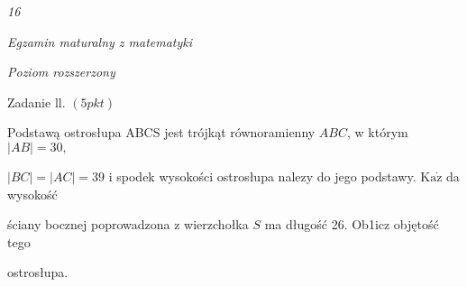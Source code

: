 \documentclass[a4paper,12pt]{article}
\begin{document}
{\it 16}

{\it Egzamin maturalny z matematyki}

{\it Poziom rozszerzony}

Zadanie ll. $(5pkt)$

Podstawą ostrosłupa ABCS jest trójkąt równoramienny $ABC$, w którym $|AB|=30,$

$|BC|=|AC|=39$ i spodek wysokości ostrosłupa nalez$\mathrm{y}$ do jego podstawy. $\mathrm{K}\mathrm{a}\dot{\mathrm{z}}$ da wysokość

ściany bocznej poprowadzona z wierzchołka $S$ ma długość 26. Ob1icz objętość tego

ostrosłupa.
\end{document}

